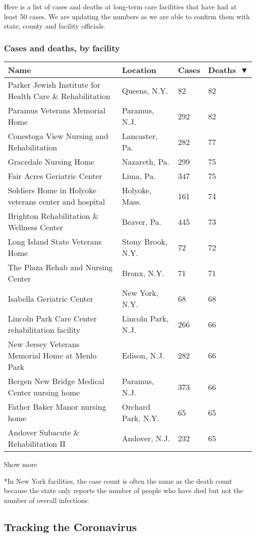 Here is a list of cases and deaths at long-term care facilities that
have had at least 50 cases. We are updating the numbers as we are able
to confirm them with state, county and facility officials.

\hypertarget{cases-and-deaths-by-facility}{%
\subsubsection{Cases and deaths, by
facility}\label{cases-and-deaths-by-facility}}

\begin{longtable}[]{@{}llll@{}}
\toprule
Name & Location & Cases & Deaths~▼\tabularnewline
\midrule
\endhead
Parker Jewish Institute for Health Care \& Rehabilitation & Queens, N.Y.
& 82 & 82\tabularnewline
Paramus Veterans Memorial Home & Paramus, N.J. & 292 & 82\tabularnewline
Conestoga View Nursing and Rehabilitation & Lancaster, Pa. & 282 &
77\tabularnewline
Gracedale Nursing Home & Nazareth, Pa. & 299 & 75\tabularnewline
Fair Acres Geriatric Center & Lima, Pa. & 347 & 75\tabularnewline
Soldiers Home in Holyoke veterans center and hospital & Holyoke, Mass. &
161 & 74\tabularnewline
Brighton Rehabilitation \& Wellness Center & Beaver, Pa. & 445 &
73\tabularnewline
Long Island State Veterans Home & Stony Brook, N.Y. & 72 &
72\tabularnewline
The Plaza Rehab and Nursing Center & Bronx, N.Y. & 71 &
71\tabularnewline
Isabella Geriatric Center & New York, N.Y. & 68 & 68\tabularnewline
Lincoln Park Care Center rehabilitation facility & Lincoln Park, N.J. &
266 & 66\tabularnewline
New Jersey Veterans Memorial Home at Menlo Park & Edison, N.J. & 282 &
66\tabularnewline
Bergen New Bridge Medical Center nursing home & Paramus, N.J. & 373 &
66\tabularnewline
Father Baker Manor nursing home & Orchard Park, N.Y. & 65 &
65\tabularnewline
Andover Subacute \& Rehabilitation II & Andover, N.J. & 232 &
65\tabularnewline
\bottomrule
\end{longtable}

Show more

*In New York facilities, the case count is often the same as the death
count because the state only reports the number of people who have died
but not the number of overall infections.

\hypertarget{tracking-the-coronavirus}{%
\subsection{Tracking the Coronavirus}\label{tracking-the-coronavirus}}


